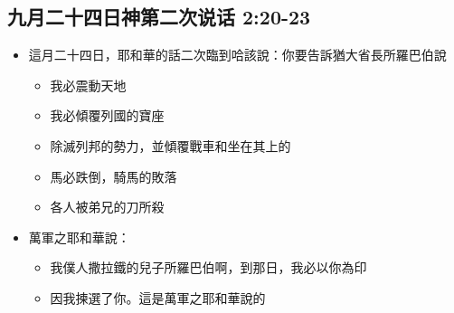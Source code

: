 \subsection{九月二十四日神第二次说话 2:20-23}
\begin{itemize} 
\itemsep-.35em 
\item 這月二十四日，耶和華的話二次臨到哈該說：你要告訴猶大省長所羅巴伯說
\begin{itemize} 
\itemsep-.35em 
\item 我必震動天地
\item 我必傾覆列國的寶座
\item 除滅列邦的勢力，並傾覆戰車和坐在其上的
\item 馬必跌倒，騎馬的敗落
\item 各人被弟兄的刀所殺
\end{itemize}
\item 萬軍之耶和華說：
\begin{itemize} 
\itemsep-.35em 
\item 我僕人撒拉鐵的兒子所羅巴伯啊，到那日，我必以你為印
\item 因我揀選了你。這是萬軍之耶和華說的
\end{itemize}
\end{itemize}





